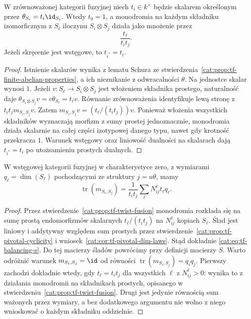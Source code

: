 \begin{stwierdzenie}\label{cat:prop:tf-twist-fusion}
W zrównoważonej kategorii fuzyjnej niech $t_i\in k^\times$ będzie skalarem określonym przez $\theta_{S_i}=t_i\id_{S_i}$. Wtedy $t_0=1$, a monodromia na każdym składniku izomorficznym z $S_\ell$ iloczynu $S_i\otimes S_j$ działa jako mnożenie przez
\[
 \frac{t_\ell}{t_i t_j}.
\]
Jeżeli skręcenie jest wstęgowe, to $t_{i^*}=t_i$.
\end{stwierdzenie}
\begin{proof}
Istnienie skalarów wynika z lematu Schura ze stwierdzenia~\ref{cat:prop:tf-finite-abelian-properties}, a ich nieznikanie z odwracalności $\theta$. Na jednostce skalar wynosi $1$. Jeżeli $v:S_\ell\to S_i\otimes S_j$ jest włożeniem składnika prostego, naturalność daje
$\theta_{S_i\otimes S_j}v=v\theta_{S_\ell}=t_\ell v$.
Równanie zrównoważenia identyfikuje lewą stronę z $t_it_j m_{S_i,S_j}v$. Zatem $m_{S_i,S_j}v=(t_\ell/(t_it_j))v$. Ponieważ włożenia wszystkich składników wyznaczają morfizm z sumy prostej jednoznacznie, monodromia działa skalarnie na całej części izotypowej danego typu, nawet gdy krotność przekracza $1$. Warunek wstęgowy oraz liniowość dualności na skalarach dają $t_{i^*}=t_i$ po utożsamieniu prostych dualnych.
\end{proof}

\begin{wniosek}\label{cat:cor:tf-balancing-s}
W wstęgowej kategorii fuzyjnej w charakterystyce zero, z wymiarami $q_\ell=\dim(S_\ell)$ pochodzącymi ze struktury $j=u\theta$, mamy
\begin{equation}\label{cat:eq:tf-balancing-s}
 \operatorname{tr}(m_{S_i,S_j})
 =\frac{1}{t_it_j}\sum_\ell N_{ij}^{\ell}t_\ell q_\ell.
\end{equation}
\end{wniosek}
\begin{proof}
Przez stwierdzenie~\ref{cat:prop:tf-twist-fusion} monodromia rozkłada się na sumę prostą endomorfizmów skalarnych $t_\ell/(t_it_j)$ na $N_{ij}^{\ell}$ kopiach $S_\ell$. Ślad jest liniowy i addytywny względem sum prostych przez stwierdzenie~\ref{cat:prop:tf-pivotal-cyclicity} i wniosek~\ref{cat:cor:tf-pivotal-dim-laws}. Stąd dokładnie \eqref{cat:eq:tf-balancing-s}. Do tej macierzy śladów powrócimy przy definicji macierzy $S$. Warto odróżnić warunek $m_{S_i,S_j}=\id$ od równości $\operatorname{tr}(m_{S_i,S_j})=q_iq_j$. Pierwszy zachodzi dokładnie wtedy, gdy $t_\ell=t_it_j$ dla wszystkich $\ell$ z $N_{ij}^{\ell}>0$: wynika to z działania monodromii na składnikach prostych, opisanego w stwierdzeniu~\ref{cat:prop:tf-twist-fusion}. Drugi jest jedynie równością sum ważonych przez wymiary, a bez dodatkowego argumentu nie wolno z niego wnioskować o każdym składniku oddzielnie.
\end{proof}

